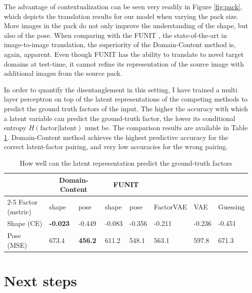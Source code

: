 \documentclass[withindex,glossary,firstyr,times]{cam-thesis}
\begin{document}
The advantage of contextualization can be seen very readily in Figure \ref{fig:pack}, which depicts the translation results for our model when varying the pack size. More images in the pack do not only improve the understanding of the shape, but also of the pose. When comparing with the FUNIT \cite{liu2019few}, the state-of-the-art in image-to-image translation, the superiority of the Domain-Content method is, again, apparent. Even though FUNIT has the ability to translate to novel target domains at test-time, it cannot refine its representation of the source image with additional images from the source pack.

In order to quantify the disentanglement in this setting, I have trained a multi layer perceptron on top of the latent representations of the competing methods to predict the ground truth factors of the input. The higher the accuracy with which a latent variable can predict the ground-truth factor, the lower its conditional entropy $H(\text{factor} | \text{latent})$ must be. The comparison results are available in Table \ref{tab:pred}. Domain-Content method achieves the highest predictive accuracy for the correct latent-factor pairing, and very low accuracies for the wrong pairing.

\begin{table}
  \caption{How well can the latent representation predict the ground-truth factors}
  \label{tab:pred}
  \centering
  \begin{tabular}{llllllll}
    \toprule
    & \multicolumn{2}{c}{Domain-Content} & \multicolumn{2}{c}{FUNIT \cite{liu2019few}} \\
    \cmidrule(r){2-5}
    Factor (metric) & shape & pose & shape & pose & FactorVAE \cite{kim2018disentangling} & VAE \cite{kingma2013auto} & Guessing \\
    \midrule
    Shape (CE) & \textbf{-0.023} & -0.449 & -0.083 & -0.356 & -0.211 & -0.236 & -0.451 \\
    Pose (MSE) & 673.4 & \textbf{456.2} & 611.2 & 548.1 & 563.1 & 597.8 & 671.3 \\
    \bottomrule
  \end{tabular}
\end{table}



\chapter{Next steps}
\label{chapter:next}
\end{document}
